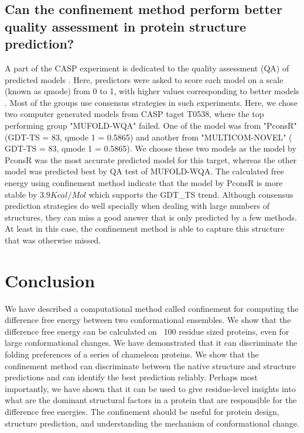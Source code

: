 \documentclass[12pt]{article}
\begin{document}
\subsection*{Can the confinement method perform better quality assessment in protein structure prediction?}

A part of the CASP experiment is dedicated to the quality assessment (QA) of predicted models \cite{Kryshtafovych2011}.
Here, predictors were asked to score each model on a scale (known as qmode) from 0 to 1, with higher values
corresponding to better models \cite{Kryshtafovych2011}. Most of the groups use consensus strategies in such experiments.
Here, we chose two computer generated models from CASP taget T0538, where the top performing group "MUFOLD-WQA" \cite{Wang2011} failed.
One of the model was from "PconsR" (GDT-TS = 83, qmode 1 = 0.5865) and another from "MULTICOM-NOVEL" ( GDT-TS = 83, qmode 1 = 0.5865). We 
choose these two models as the model by PconsR was the most accurate
predicted model for this target, whereas the other model was predicted best by QA test of MUFOLD-WQA. The calculated
free energy using confinement method indicate that the model by PconsR is more stable by $3.9
Kcal/Mol$ which supports
the GDT\_TS trend.  Although consensus prediction strategies do well specially when dealing with large numbers of structures, they 
can miss a good answer that is only predicted by a few methods. At least in this case, the confinement
method is able to capture this structure that was otherwise missed.


\section*{Conclusion}

We have described a computational method called confinement for computing the difference free energy between two
conformational ensembles. We show that the difference free energy can be calculated on ~100 residue sized proteins, even
for large conformational changes. We have demonstrated that it can discriminate the folding preferences of a series of
chameleon proteins. We show that the confinement method can discriminate between the native structure and structure
predictions and can identify the best prediction reliably. Perhaps most importantly, we have shown that it can be used
to give residue-level insights into what are the dominant structural factors in a protein that are responsible for the
difference free energies. The confinement should be useful for protein design, structure prediction, and understanding
the mechanism of conformational change.
\end{document}
